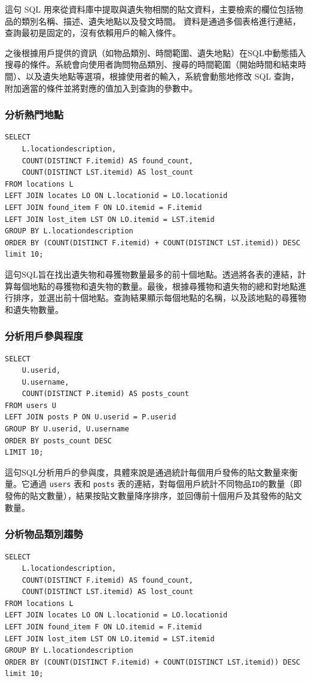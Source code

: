 \documentclass[12pt,a4paper]{article}
\begin{document}
這句 SQL 用來從資料庫中提取與遺失物相關的貼文資料，主要檢索的欄位包括物品的類別名稱、描述、遺失地點以及發文時間。
資料是通過多個表格進行連結，查詢最初是固定的，沒有依賴用戶的輸入條件。

之後根據用戶提供的資訊（如物品類別、時間範圍、遺失地點）在SQL中動態插入搜尋的條件。系統會向使用者詢問物品類別、搜尋的時間範圍（開始時間和結束時間）、以及遺失地點等選項，根據使用者的輸入，系統會動態地修改 SQL 查詢，附加適當的條件並將對應的值加入到查詢的參數中。

\subsubsection{分析熱門地點}
\begin{lstlisting}
SELECT 
    L.locationdescription,
    COUNT(DISTINCT F.itemid) AS found_count,
    COUNT(DISTINCT LST.itemid) AS lost_count
FROM locations L
LEFT JOIN locates LO ON L.locationid = LO.locationid
LEFT JOIN found_item F ON LO.itemid = F.itemid
LEFT JOIN lost_item LST ON LO.itemid = LST.itemid
GROUP BY L.locationdescription
ORDER BY (COUNT(DISTINCT F.itemid) + COUNT(DISTINCT LST.itemid)) DESC
limit 10;
\end{lstlisting}

這句SQL旨在找出遺失物和尋獲物數量最多的前十個地點。透過將各表的連結，計算每個地點的尋獲物和遺失物的數量。最後，根據尋獲物和遺失物的總和對地點進行排序，並選出前十個地點。查詢結果顯示每個地點的名稱，以及該地點的尋獲物和遺失物數量。

\subsubsection{分析用戶參與程度}
\begin{lstlisting}
SELECT 
    U.userid,
    U.username,
    COUNT(DISTINCT P.itemid) AS posts_count
FROM users U
LEFT JOIN posts P ON U.userid = P.userid
GROUP BY U.userid, U.username
ORDER BY posts_count DESC
LIMIT 10;
\end{lstlisting}

這句SQL分析用戶的參與度，具體來說是通過統計每個用戶發佈的貼文數量來衡量。它通過 \texttt{users} 表和 \texttt{posts} 表的連結，對每個用戶統計不同物品\texttt{ID}的數量（即發佈的貼文數量），結果按貼文數量降序排序，並回傳前十個用戶及其發佈的貼文數量。

\subsubsection{分析物品類別趨勢}
\begin{lstlisting}
SELECT 
    L.locationdescription,
    COUNT(DISTINCT F.itemid) AS found_count,
    COUNT(DISTINCT LST.itemid) AS lost_count
FROM locations L
LEFT JOIN locates LO ON L.locationid = LO.locationid
LEFT JOIN found_item F ON LO.itemid = F.itemid
LEFT JOIN lost_item LST ON LO.itemid = LST.itemid
GROUP BY L.locationdescription
ORDER BY (COUNT(DISTINCT F.itemid) + COUNT(DISTINCT LST.itemid)) DESC
limit 10;
\end{lstlisting}
\end{document}
